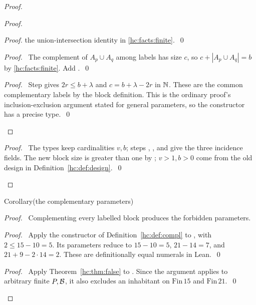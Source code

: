 \begin{mergedproofsection}
\begin{proof}
\begin{proof}
\begin{proof}
   the union-intersection identity in \ref{hc:facts:finite}.~\qed\end{proof}
  \begin{proof}\pf\ The complement of $A_p\cup A_q$ among labels
   has size $c$, so $c+|A_p\cup A_q|=b$ by
   \ref{hc:facts:finite}. Add .~\qed\end{proof}
  \qedstep
  \begin{proof}\pf\ Step  gives
   $2r\le b+\lambda$ and $c=b+\lambda-2r$ in ${\mathbb N}$.
   These are the common complementary labels by the block definition.
   This is the ordinary proof's inclusion-exclusion argument stated
   for general parameters, so the constructor has a precise type.~\qed\end{proof}
 \end{proof}
 \qedstep
 \begin{proof}\pf\ The types keep cardinalities $v,b$;
  steps , ,
  and  give the three incidence fields.
  The new block size is greater than one by ; $v>1,b>0$
  come from the old design in Definition~\ref{hc:def:design}.~\qed\end{proof}
\end{proof}

\begin{namedresult}{Corollary}{(the complementary parameters)}\label{hc:cor:complement}
 \leavevmode\par
\end{namedresult}
\begin{proof}
 \pfsketch\ Complementing every labelled block produces the forbidden parameters.
 \begin{proof}\pf\ Apply the constructor of Definition~\ref{hc:def:compl}
  to , with $2\le15-10=5$.
  Its parameters reduce to $15-10=5$, $21-14=7$, and
  $21+9-2\cdot14=2$. These are definitionally equal numerals in Lean.~\qed\end{proof}
 \qedstep
 \begin{proof}\pf\ Apply Theorem~\ref{hc:thm:false} to
  . Since the argument applies to arbitrary
  finite $P,{\mathcal B}$, it also excludes an inhabitant on
  $\mathrm{Fin}\,15$ and $\mathrm{Fin}\,21$.~\qed\end{proof}
\end{proof}


\end{mergedproofsection}
